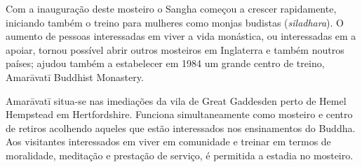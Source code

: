 Com a inauguração deste mosteiro o Sangha começou a crescer rapidamente,
iniciando também o treino para mulheres como monjas budistas (\emph{siladhara}).
O aumento de pessoas interessadas em viver a vida monástica, ou interessadas em
a apoiar, tornou possível abrir outros mosteiros em Inglaterra e também noutros
países; ajudou também a estabelecer em 1984 um grande centro de treino,
Amarāvatī Buddhist Monastery.

Amarāvatī situa-se nas imediações da vila de Great Gaddesden perto de Hemel
Hempstead em Hertfordshire. Funciona simultaneamente como mosteiro e centro de
retiros acolhendo aqueles que estão interessados nos ensinamentos do Buddha. Aos
visitantes interessados em viver em comunidade e treinar em termos de
moralidade, meditação e prestação de serviço, é permitida a estadia no mosteiro.

